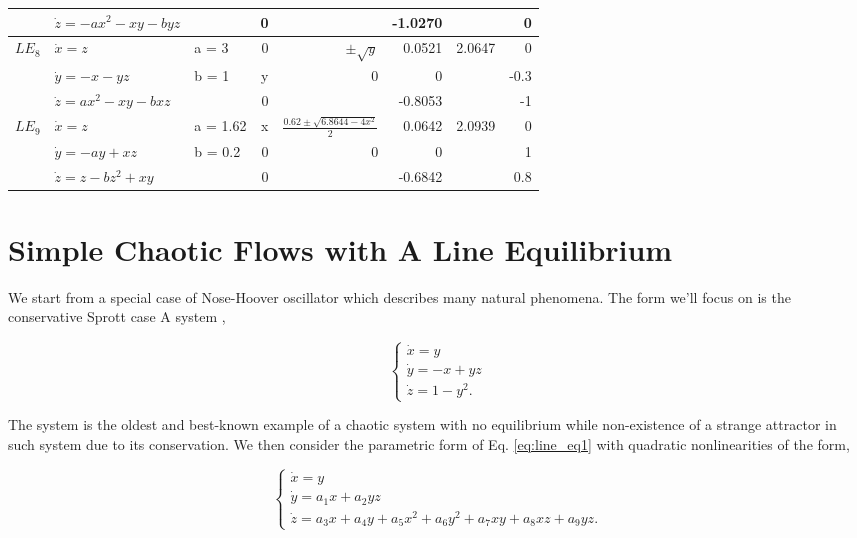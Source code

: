 \begin{table}[htb]
\begin{tabular}{lllrrrrr}
 & \(\dot{z} = -ax^2 - xy - byz\) &  & 0 &  & -1.0270 &  & 0\\
\hline
\(LE_8\) & \(\dot{x} = z\) & a = 3 & 0 & $\pm{}\sqrt{y}$ & 0.0521 & 2.0647 & 0\\
 & \(\dot{y} = -x - yz\) & b = 1 & y & 0 & 0 &  & -0.3\\
 & \(\dot{z} = ax^2 - xy - bxz\) &  & 0 &  & -0.8053 &  & -1\\
\hline
\(LE_9\) & \(\dot{x} = z\) & a = 1.62 & x & $\frac{0.62\pm{}\sqrt{6.8644-4x^2}}{2}$ & 0.0642 & 2.0939 & 0\\
 & \(\dot{y} = -ay + xz\) & b = 0.2 & 0 & 0 & 0 &  & 1\\
 & \(\dot{z} = z - bz^2 + xy\) &  & 0 &  & -0.6842 &  & 0.8\\
\hline
\hline
\end{tabular}
\end{table}

\section{Simple Chaotic Flows with A Line Equilibrium}

We start from a special case of Nose-Hoover oscillator \cite{Hoover1995Remark} which describes many
natural phenomena\cite{Posch1986Canonical}.
The form we'll focus on is the conservative Sprott case A system \cite{Sprott1994Some},

\begin{equation}
\label{eq:line_eq1}
  \left\{
    \begin{array}{l}
      \dot{x}=y\\
      \dot{y}=-x+yz \\
      \dot{z}=1-y^{2}.
    \end{array}
  \right.
\end{equation}

The system is the oldest and best-known example of a chaotic system with no equilibrium while
non-existence of a strange attractor in such system due to its conservation. We then consider
the parametric form of Eq. \ref{eq:line_eq1} with quadratic nonlinearities of the form,

\begin{equation}
\label{eq:line_eq2}
  \left\{
    \begin{array}{l}
      \dot{x}=y\\
      \dot{y}=a_1x+a_2yz \\
      \dot{z}=a_3x+a_4y+a_5x^{2}+a_6y^2+a_7xy+a_8xz+a_9yz.
    \end{array}
  \right.
\end{equation}

